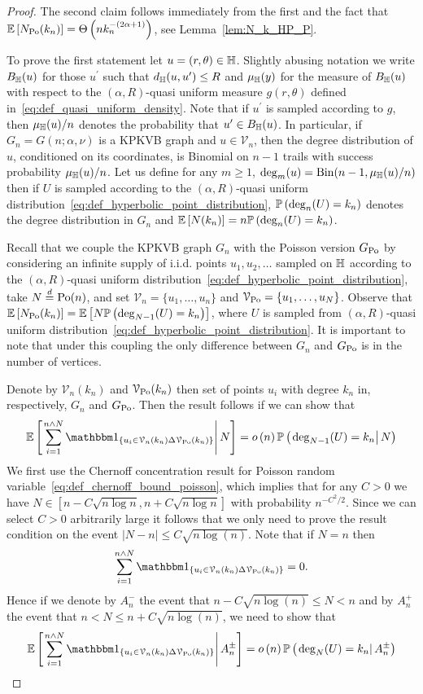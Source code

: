 \begin{proof}
The second claim follows immediately from the first and the fact that $\mathbb{E}\left[N_{{\mathrm{Po}}}(k_n)\right] = \Theta\left(n k_n^{-(2\alpha + 1)}\right)$, see Lemma~\ref{lem:N_k_HP_P}.

To prove the first statement let $u = (r,\theta) \in \mathbb{H}$. Slightly abusing notation we write $B_{\mathbb{H}}(u)$ for those $u^\prime$ such that $d_{\mathbb{H}}(u,u^\prime) \le R$ and $\mu_{\mathbb{H}}(y)$ for the measure of $B_{\mathbb{H}}(u)$ with respect to the $(\alpha, R)$-quasi uniform measure $g(r,\theta)$ defined in~\eqref{eq:def_quasi_uniform_density}. Note that if $u^\prime$ is sampled according to $g$, then $\mu_{\mathbb{H}}(u)/n$ denotes the probability that $u^\prime \in B_{\mathbb{H}}(u)$. In particular, if $G_n = G(n; \alpha, \nu)$ is a KPKVB graph and $u \in \mathcal{V}_n$, then the degree distribution of $u$, conditioned on its coordinates, is Binomial on $n-1$ trails with success probability $\mu_{\mathbb{H}}(u)/n$. Let us define for any $m \ge 1$, $\mathrm{deg}_m(u) = \mathrm{Bin}(n-1, \mu_{\mathbb{H}}(u)/n)$ then if $U$ is sampled according to the  $(\alpha, R)$-quasi uniform distribution~\eqref{eq:def_hyperbolic_point_distribution}, $\mathbb{P}\left(\mathrm{deg}_n(U) = k_n\right)$ denotes the degree distribution in $G_n$ and $\mathbb{E}\left[N(k_n)\right] = n \mathbb{P}\left(\mathrm{deg}_n(U) = k_n\right)$. 

Recall that we couple the KPKVB graph $G_n$ with the Poisson version $G_{\text{Po}}$ by considering an infinite supply of i.i.d. points $u_1, u_2, \dots$ sampled on $\mathbb{H}$ according to the $(\alpha, R)$-quasi uniform distribution~\eqref{eq:def_hyperbolic_point_distribution}, take $N \stackrel{d}{=} {\mathrm{Po}}(n)$, and set $\mathcal{V}_n =\{u_1, \dots, u_n\}$ and $\mathcal{V}_{{\mathrm{Po}}} = \{u_1, \dots, u_N\}$. Observe that $\mathbb{E}\left[N_{{\mathrm{Po}}}(k_n)\right] = \mathbb{E}\left[N \mathbb{P}\left(\mathrm{deg}_{N-1}(U) = k_n\right)\right]$, where $U$ is sampled from $(\alpha, R)$-quasi uniform distribution~\eqref{eq:def_hyperbolic_point_distribution}. It is important to note that under this coupling the only difference between $G_n$ and $G_{\text{Po}}$ is in the number of vertices.

Denote by $\mathcal{V}_n(k_n)$ and $\mathcal{V}_{{\mathrm{Po}}}(k_n)$ then set of points $u_i$ with degree $k_n$ in, respectively, $G_n$ and $G_{\text{Po}}$. Then the result follows if we can show that
\[
	\CExp{\sum_{i = 1}^{n \wedge N} \ind{u_i \in \mathcal{V}_n(k_n) \Delta \VPo(k_n)}}{N} 
	= \smallO{n}\CProb{\deg_{N-1}(U) = k_n}{N}
\]
We first use the Chernoff concentration result for Poisson random variable~\eqref{eq:def_chernoff_bound_poisson}, which implies that for any $C>0$ we have $N \in [n-C\sqrt{n\log n},n+C\sqrt{n \log n}]$ with probability $n^{-C^2/2}$. Since we can select $C > 0$ arbitrarily large it follows that we only need to prove the result condition on the event $|N-n|\le C\sqrt{n \log(n)}$. Note that if $N = n$ then 
\[
	\sum_{i = 1}^{n \wedge N} \ind{u_i \in \mathcal{V}_n(k_n) \Delta \VPo(k_n)} = 0.
\]
Hence if we denote by $A_n^-$ the event that $n - C\sqrt{n \log(n)} \le N < n$ and by $A_n^+$ the event that $n < N \le n + C\sqrt{n \log(n)}$, we need to show that
\[
	\CExp{\sum_{i = 1}^{n \wedge N} \ind{u_i \in \mathcal{V}_n(k_n) \Delta \VPo(k_n)}}{A_n^\pm} 
		= \smallO{n}\CProb{\deg_N(U) = k_n}{A_n^\pm}
\]


\end{proof}
